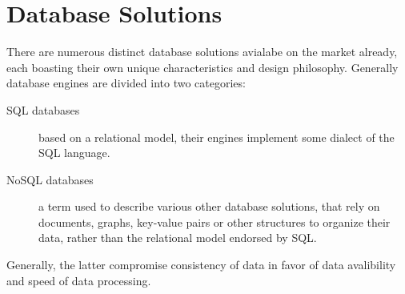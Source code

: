 \chapter{Database Solutions}
\label{ch:background}
\par There are numerous distinct database solutions avialabe on the market already, each boasting their own unique characteristics and design philosophy. Generally database engines are divided into two categories:
\begin{description}
  \item[SQL databases] based on a relational model, their engines implement some dialect of the SQL language.
  \item[NoSQL databases] a term used to describe various other database solutions, that rely on documents, graphs, key-value pairs or other structures to organize their data, rather than the relational model endorsed by SQL.
\end{description}

\par Generally, the latter compromise consistency of data in favor of data avalibility and speed of data processing.

%
